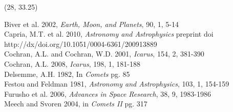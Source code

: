 \documentclass[a0]{a0poster}
\def\SecTitle#1{\noindent{\veryHuge\color{Green} #1}}
\begin{document}
\begin{textblock}{12}(28, 33.25)
\center
\SecTitle{References}\\
\bigskip
\raggedright
\normalsize
{
Biver et al. 2002, \textit{Earth, Moon, and Planets}, 90, 1, 5-14\\
Capria, M.T. et al. 2010, \textit{Astronomy and Astrophysics} preprint doi http://dx/doi.org/10.1051/0004-6361/200913889\\
Cochran, A.L. and Cochran, W.D. 2001, \textit{Icarus}, 154, 2, 381-390\\
Cochran, A.L. 2008, \textit{Icarus}, 198, 1, 181-188\\ 
Delsemme, A.H. 1982, In \textit{Comets} pg. 85\\
Festou and Feldman 1981, \textit{Astronomy and Astrophysics}, 103, 1, 154-159\\
Furusho et al. 2006, \textit{Advances in Space Research}, 38, 9, 1983-1986\\
Meech and Svoren 2004, in \textit{Comets II} pg. 317\\
}
\end{textblock}
\end{document}
